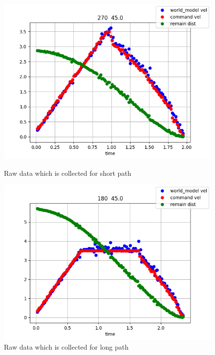 \documentclass{llncs}
\begin{document}
\begin{figure}
\centering
\begin{minipage}{0.45\textwidth}
\centering
\includegraphics[width=\linewidth]{img/motion1}
\caption{Raw data which is collected for short path}
\label{fig:motion1}
\end{minipage}
\centering
\begin{minipage}{0.45\textwidth}
\centering
\includegraphics[width=\linewidth]{img/motion2}
\caption{Raw data which is collected for long path}
\label{fig:motion2}
\end{minipage}
\end{figure}

\newpage
\end{document}
